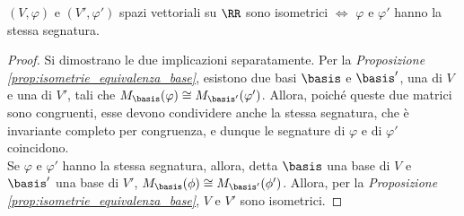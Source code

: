 \begin{proposition} $(V, \varphi)$ e $(V', \varphi')$ spazi vettoriali
	su $\RR$ sono
	isometrici $\iff$ $\varphi$ e $\varphi'$ hanno la stessa segnatura.
\end{proposition}

\begin{proof}Si dimostrano le due implicazioni separatamente.\nl\nl
	\rightproof Per la \textit{Proposizione \ref{prop:isometrie_equivalenza_base}}, esistono due basi $\basis$ e $\basis'$, una di $V$ e una di $V'$,
	tali che $M_\basis(\varphi) \cong M_{\basis'}(\varphi')$. Allora, poiché queste due matrici sono congruenti, esse devono condividere anche la stessa
	segnatura, che è invariante completo per congruenza, e dunque le segnature di $\varphi$ e di $\varphi'$ coincidono. \\
	
	\leftproof Se $\varphi$ e $\varphi'$ hanno la stessa segnatura, allora, detta $\basis$
	una base di $V$ e $\basis'$ una base di $V'$, $M_\basis(\phi) \cong M_{\basis'}(\phi')$.
	Allora, per la \textit{Proposizione \ref{prop:isometrie_equivalenza_base}}, $V$ e $V'$ sono isometrici.
\end{proof}